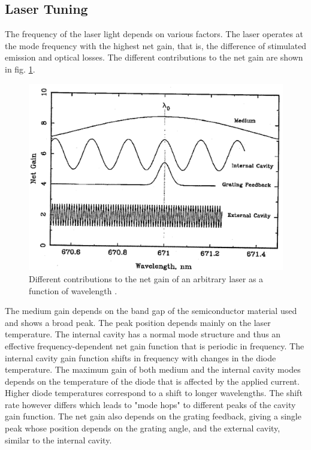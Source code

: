 \subsection*{Laser Tuning}
The frequency of the laser light depends on various factors. The laser operates at the mode frequency with the 
highest net gain, that is, the difference of stimulated emission and optical losses.
The different contributions to the net gain are shown in fig. \ref{fig:netgain}.
\begin{figure}
    \centering
    \includegraphics[width = 0.6\linewidth]{Bilder/netgain.png}
    \caption{Different contributions to the net gain of an arbitrary laser as a function of wavelength \cite{sample}.}
    \label{fig:netgain}
\end{figure}
The medium gain depends on the band gap of the semiconductor material used and shows a broad peak. The 
peak position depends mainly on the laser temperature.
The internal cavity has a normal mode structure and thus an effective frequency-dependent net gain function that is 
periodic in frequency. The internal cavity gain function shifts in frequency with changes in the diode temperature.
The maximum gain of both medium and the internal cavity modes depends on the temperature of the diode that is affected by 
the applied current. Higher diode temperatures correspond to a shift to longer wavelengths. The shift rate however differs 
which leads to "mode hops" to different peaks of the cavity gain function.
The net gain also depends on the grating feedback, giving a single peak whose position depends on the grating angle, and
the external cavity, similar to the internal cavity.

